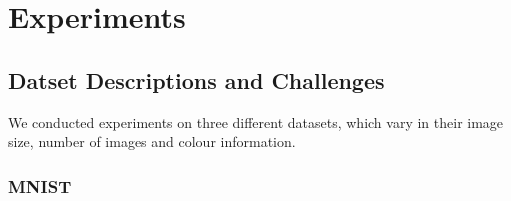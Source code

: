 \documentclass[draft]{article}
\begin{document}
\section{Experiments}

  \subsection{Datset Descriptions and Challenges}
  We conducted experiments on three different datasets, which vary in their image size, number of images and colour information.
    \subsubsection{MNIST}
\end{document}
